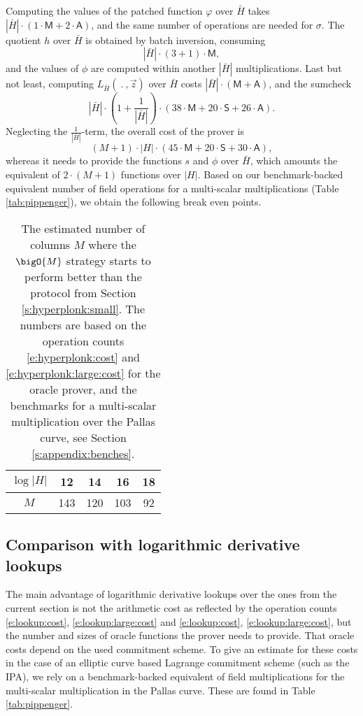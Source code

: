 \documentclass[11pt]{article}
\theoremstyle{definition}
\theoremstyle{remark}
\begin{document}
Computing the values of the patched function $\varphi$  over $\bar H$ takes $|\bar H |\cdot (1\cdot \mathsf M + 2\cdot \mathsf A)$,
and the same number of operations are needed for $\sigma$.
The quotient $h$ over $\bar H$ is obtained by batch inversion, consuming
\[
|\bar H|\cdot (3 + 1) \cdot \mathsf M,
\]
and the values of $\phi$ are computed within another $|\bar H|$ multiplications.
Last but not least, computing $L_{\bar H}(\:.\:, \vec z)$ over $\bar H$ costs $|\bar H|\cdot (\mathsf M + \mathsf A)$, and the sumcheck 
\[
|\bar H| \cdot \left(1 + \frac{1}{|\bar H|}\right) \cdot (38 \cdot \mathsf M + 20 \cdot \mathsf S + 26\cdot\mathsf A).
\] 
Neglecting the $\frac{1}{|\bar H|}$-term, the overall cost of the prover is
\begin{equation}
\label{e:hyperplonk:large:cost}
(M+1)\cdot |H| \cdot (45 \cdot \mathsf M + 20 \cdot \mathsf S + 30\cdot\mathsf A),
\end{equation}
whereas it needs to provide the functions $s$ and $\phi$ over $\bar H$, which amounts the equivalent of $2\cdot (M+1)$ functions over $|H|$.
Based on our benchmark-backed equivalent number of field operations for a multi-scalar multiplications (Table \ref{tab:pippenger}), we obtain the following break even points.
\begin{table}[h!]
\caption{%
The estimated number of columns $M$ where the $\bigO{M}$ strategy starts to perform better than the protocol from Section \ref{s:hyperplonk:small}. 
The numbers are based on the operation counts \eqref{e:hyperplonk:cost} and \eqref{e:hyperplonk:large:cost} for the oracle prover, and the benchmarks for a multi-scalar multiplication over the Pallas curve, see Section \ref{s:appendix:benches}.
}
\vspace*{0.5cm}
\centering
\begin{tabular} {|c|c|c|c|c|}
\hline
$\log|H|$ & 12 & 14 & 16 & 18
\\\hline
$M$ & 143 & 120 & 103 & 92
\\\hline
\end{tabular}
\end{table}

\subsection{Comparison with logarithmic derivative lookups}

The main advantage of logarithmic derivative lookups over the ones from the current section is not the arithmetic cost  as reflected by the operation counts  \eqref{e:lookup:cost}, \eqref{e:lookup:large:cost} and \eqref{e:lookup:cost}, \eqref{e:lookup:large:cost}, but the number and sizes of oracle functions the prover needs to provide.
That oracle costs depend on the used commitment scheme.
To give an estimate for these costs in the case of an elliptic curve based Lagrange commitment scheme (such as the IPA), we 
rely on a benchmark-backed equivalent of field multiplications for the multi-scalar multiplication in the Pallas curve.
These are found in Table \ref{tab:pippenger}.
\end{document}
